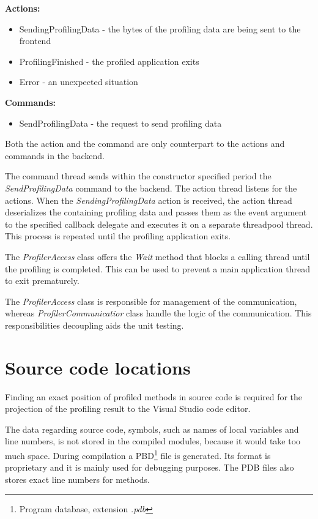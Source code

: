 \textbf{Actions:}
\begin{itemize}	
\item	SendingProfilingData - the bytes of the profiling data are being sent to the frontend
\item	ProfilingFinished - the profiled application exits
\item   Error - an unexpected situation
\end{itemize}

\textbf{Commands:}
\begin{itemize}	
\item	SendProfilingData - the request to send profiling data
\end{itemize}

Both the action and the command are only counterpart to the actions and commands in the backend.

The command thread sends within the constructor specified period the \textit{SendProfilingData} command to the backend. The action thread listens for the actions. When the \textit{SendingProfilingData} action is received, the action thread deserializes the containing profiling data and passes them as the event argument to the specified callback delegate and executes it on a separate threadpool thread. This process is repeated until the profiling application exits.

The \textit{ProfilerAccess} class offers the \textit{Wait} method that blocks a calling thread until the profiling is completed. This can be used to prevent a main application thread to exit prematurely.

The \textit{ProfilerAccess} class is responsible for management of the communication, whereas \textit{ProfilerCommunicatior} class handle the logic of the communication. This responsibilities decoupling aids the unit testing.

\section{Source code locations}
Finding an exact position of profiled methods in source code is required for the projection of the profiling result to the Visual Studio code editor. 

The data regarding source code, symbols, such as names of local variables and line numbers, is not stored in the compiled modules, because it would take too much space. During compilation a PBD\footnote{Program database, extension \textit{.pdb}} file is generated. Its format is proprietary and it is mainly used for debugging purposes. The PDB files also stores exact line numbers for methods.

